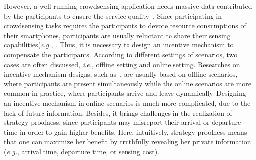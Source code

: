 \documentclass[conference,compsocconf,letterpaper,10pt]{IEEEtran}
\newcommand{\ie}{{\em i.e.}}
\newcommand{\eg}{{\em e.g.}}
\begin{document}
However, a well running crowdsensing application needs massive data contributed by the participants to ensure the service quality~\cite{Wang:2015:CQO:2750858.2807513,Han:2016:PPR:2942358.2942385}. Since participating in crowdsensing tasks requires the participants to devote resource consumptions of their smartphones, participants are usually reluctant to share their sensing capabilities(\eg, \cite{Kawajiri:2014:SCI:2632048.2636064,Fan:2015:PTT:2789168.2795179,Karaliopoulos:2016:FLE:2942358.2942369}. Thus, it is necessary to design an incentive mechanism to compensate the participants. According to different settings of scenarios, two cases are often discussed, \ie, offline setting and online setting. Researches on incentive mechanism designs, such as~\cite{yang2012crowdsourcing,koutsopoulos2013optimal}, are usually based on offline scenarios, where participants are present simultaneously while the online scenarios are more common in practice, where participants arrive and leave dynamically. Designing an incentive mechanism in online scenarios is much more complicated, due to the lack of future information. Besides, it brings challenges in the realization of strategy-proofness, since participants may misreport their arrival or departure time in order to gain higher benefits. Here, intuitively, strategy-proofness means that one can maximize her benefit by truthfully revealing her private information (\eg, arrival time, departure time, or sensing cost).

\end{document}
